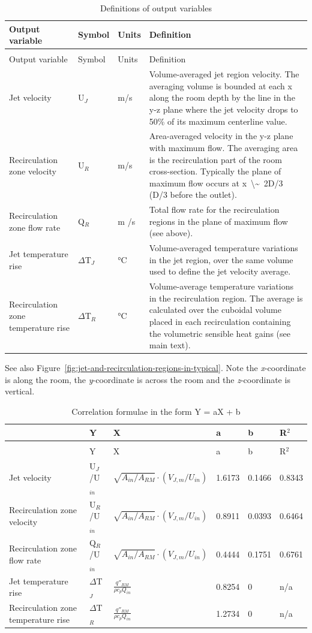 \begin{longtable}[c]{p{1.25in}p{0.5in}p{0.5in}p{3.0in}}
\caption{Definitions of output variables \label{table:definitions-of-output-variables}} \tabularnewline
\toprule 
Output variable & Symbol & Units & Definition \tabularnewline
\midrule
\endfirsthead

\caption[]{Definitions of output variables} \tabularnewline
\toprule 
Output variable & Symbol & Units & Definition \tabularnewline
\midrule
\endhead
Jet velocity & U\(_J\) & m/s & Volume-averaged jet region velocity. The averaging volume is bounded at each x along the room depth by the line in the y-z plane where the jet velocity drops to 50\% of its maximum centerline value. \tabularnewline
Recirculation zone velocity & U\(_R\) & m/s & Area-averaged velocity in the y-z plane with maximum flow. The averaging area is the recirculation part of the room cross-section. Typically the plane of maximum flow occurs at x~\textbackslash\~{}~2D/3 (D/3 before the outlet). \tabularnewline
Recirculation zone flow rate & Q\(_R\) & m  /s & Total flow rate for the recirculation regions in the plane of maximum flow (see above). \tabularnewline
Jet temperature rise & $\Delta$T\(_J\) & °C & Volume-averaged temperature variations in the jet region, over the same volume used to define the jet velocity average. \tabularnewline
Recirculation zone temperature rise & $\Delta$T\(_R\) & °C & Volume-average temperature variations in the recirculation region. The average is calculated over the cuboidal volume placed in each recirculation containing the volumetric sensible heat gains (see main text). \tabularnewline
\bottomrule
\end{longtable}

See also Figure~\ref{fig:jet-and-recirculation-regions-in-typical}. Note the \emph{x}-coordinate is along the room, the \emph{y}-coordinate is across the room and the \emph{z}-coordinate is vertical.

\begin{longtable}[c]{p{1.0in}p{0.5in}p{2.0in}p{0.5in}p{0.5in}p{0.5in}}
\caption{Correlation formulae in the form Y = aX + b \label{table:correlation-formulae-in-the-form-y-ax-+-b}} \tabularnewline
\toprule 
~ & Y & X & a & b & R\(^2\) \tabularnewline
\midrule
\endfirsthead

\caption[]{Correlation formulae in the form Y = aX + b} \tabularnewline
\toprule 
~ & Y & X & a & b & R\(^2\) \tabularnewline
\midrule
\endhead
Jet velocity & U\(_J\)/U\(_{in}\) & $\sqrt{A_{in}/A_{RM}} \cdot \left(V_{J,m}/U_{in}\right)$ & 1.6173 & 0.1466 & 0.8343 \tabularnewline
Recirculation zone velocity & U\(_R\)/U\(_{in}\) & $\sqrt{A_{in}/A_{RM}} \cdot \left(V_{J,m}/U_{in}\right)$ & 0.8911 & 0.0393 & 0.6464 \tabularnewline
Recirculation zone flow rate & Q\(_R\)/U\(_{in}\) & $\sqrt{A_{in}/A_{RM}} \cdot \left(V_{J,m}/U_{in}\right)$ & 0.4444 & 0.1751 & 0.6761 \tabularnewline
Jet temperature rise & $\Delta$T\(_J\) & $\frac{q''_{RM}}{\rho {c_p}{Q_{in}}}$ & 0.8254 & 0 & n/a \tabularnewline
Recirculation zone temperature rise & $\Delta$T\(_R\) & $\frac{q''_{RM}}{\rho {c_p}{Q_{in}}}$ & 1.2734 & 0 & n/a \tabularnewline
\bottomrule
\end{longtable}


